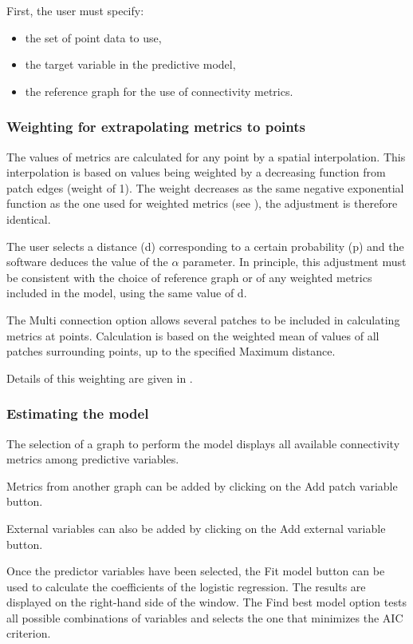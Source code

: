 \documentclass{article}
\begin{document}
First, the user must specify:
\begin{itemize}
	\item the set of point data to use,
	\item the target variable in the predictive model,
	\item the reference graph for the use of connectivity metrics.
\end{itemize}

\subsubsection{Weighting for extrapolating metrics to points}

The values of metrics are calculated for any point by a spatial interpolation. This interpolation is based on values being weighted by a decreasing function from patch edges (weight of 1). The weight decreases as the same negative exponential function as the one used for weighted metrics (see ), the adjustment is therefore
identical. 

The user selects a distance (d) corresponding to a certain probability (p) and the software deduces the value of the $\alpha $ parameter. In principle, this adjustment must be consistent with the choice of reference graph or of any weighted metrics included in the model, using the same value of d.

The Multi connection option allows several patches to be included in calculating metrics at points. Calculation is based on the weighted mean of values of all patches surrounding points, up to the specified Maximum distance.

Details of this weighting are given in \cite{2012_SDM}.

\subsubsection{Estimating the model}

The selection of a graph to perform the model displays all available connectivity metrics among predictive variables.

Metrics from another graph can be added by clicking on the Add patch variable button.

External variables can also be added by clicking on the Add external variable button.

Once the predictor variables have been selected, the Fit model button can be used to calculate the coefficients of the logistic regression. The results are displayed on the right-hand side of the window. The Find best model option tests all possible combinations of variables and selects the one that minimizes the AIC criterion.
\end{document}
